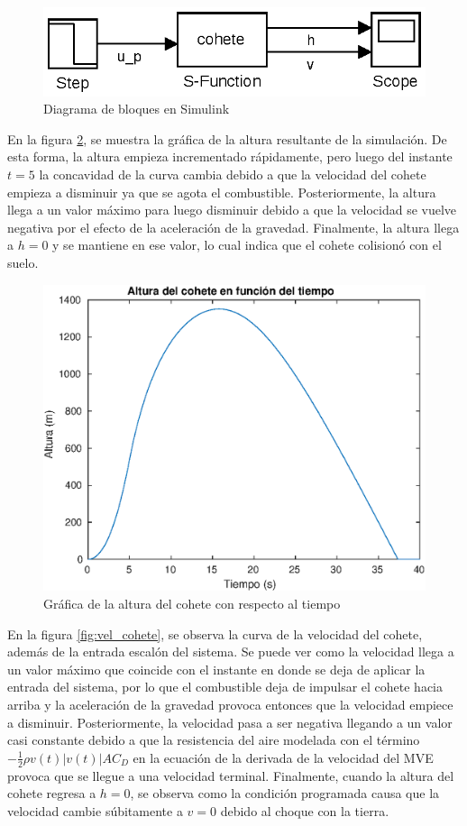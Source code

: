\documentclass[12pt,letterpaper]{article}
\begin{document}
\begin{figure}[ht!]
  \centering
  \includegraphics[width=0.5\linewidth]{pictures/Ejercicio3/simulink_cohete.eps}
  \caption{Diagrama de bloques en Simulink}
  \label{fig:diag_simulink}
\end{figure}

En la figura \ref{fig:alt_cohete}, se muestra la gráfica de la altura resultante de la
simulación. De esta forma, la altura empieza incrementado rápidamente, pero luego del instante $t=5$
la concavidad de la curva cambia debido a que la velocidad del cohete empieza a disminuir ya que se
agota el combustible. Posteriormente, la altura llega a un valor máximo para luego disminuir debido
a que la velocidad se vuelve negativa por el efecto de la aceleración de la gravedad. Finalmente, la
altura llega a $h=0$ y se mantiene en ese valor, lo cual indica que el cohete colisionó con el suelo.


\begin{figure}[ht!]
  \centering
  \includegraphics[width=0.5\linewidth]{pictures/Ejercicio3/altura_cohete_vs_tiempo.eps}
  \caption{Gráfica de la altura del cohete con respecto al tiempo}
  \label{fig:alt_cohete}
\end{figure}

En la figura \ref{fig:vel_cohete}, se observa la curva de la velocidad del cohete, además de la
entrada escalón del sistema. Se puede ver como la velocidad llega a un valor máximo que coincide con
el instante en donde se deja de aplicar la entrada del sistema, por lo que el combustible deja de
impulsar el cohete hacia arriba y la aceleración de la gravedad provoca entonces que la velocidad
empiece a disminuir. Posteriormente, la velocidad pasa a ser negativa llegando a un valor casi
constante debido a que la resistencia del aire modelada con el término
$-\frac{1}{2}\rho v(t)|v(t)| A C_D$ en la ecuación de la derivada de la velocidad del MVE provoca
que se llegue a una velocidad terminal. Finalmente, cuando la altura del cohete regresa a $h=0$, se
observa como la condición programada causa que la velocidad cambie súbitamente a $v=0$ debido al
choque con la tierra.
\end{document}
